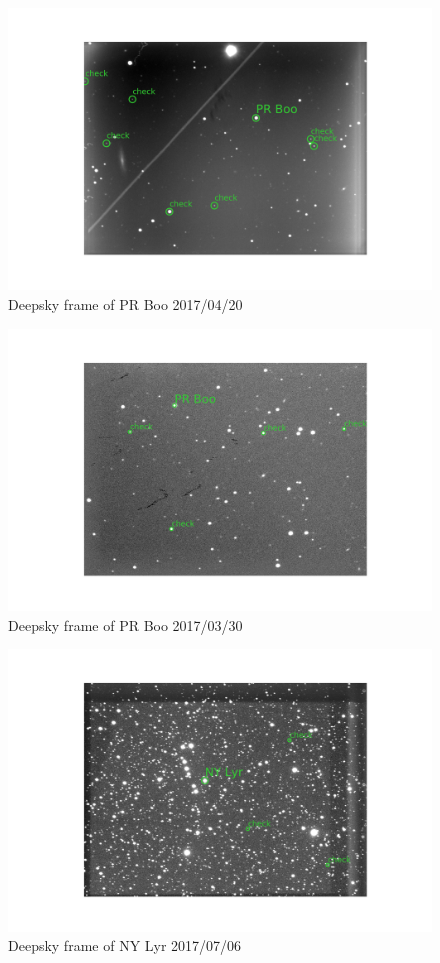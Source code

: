 \begin{figure}[h]
    \centering
    \includegraphics[width=\columnwidth]{figures/deepsky_prboo_170420.png}
    \caption{Deepsky frame of PR Boo 2017/04/20}
\label{fig:deepskyprboo}
\end{figure}
\begin{figure}[h]
    \centering
    \includegraphics[width=\columnwidth]{figures/deepsky_prboo_170330.png}
    \caption{Deepsky frame of PR Boo 2017/03/30}
\label{fig:deepskyprboo2}
\end{figure}
\begin{figure}[h]
    \centering
    \includegraphics[width=\columnwidth]{figures/deepsky_nylyr_170706.png}
    \caption{Deepsky frame of NY Lyr 2017/07/06}
\label{fig:deepskynylyr}
\end{figure}
